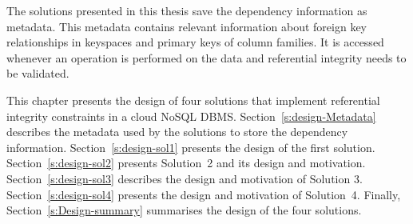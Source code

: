 The solutions presented in this thesis save the dependency information as
metadata.  This metadata contains relevant  information about  foreign
key relationships in keyspaces and primary keys of column families.  It is
accessed whenever an operation is performed on the data and referential
integrity needs to be validated. 


This chapter presents the design of  four  solutions  that implement referential
integrity constraints in a cloud \ac{NoSQL} \ac{DBMS}. 
Section~\ref{s:design-Metadata} describes the metadata used by the solutions 
 to store the dependency information.  Section~\ref{s:design-sol1} presents the
 design of the first solution.  Section~\ref{s:design-sol2} presents Solution~2
 and its design and motivation.  Section~\ref{s:design-sol3} describes the design
 and motivation of Solution 3.  Section~\ref{s:design-sol4} presents the design
 and motivation of Solution~4.  Finally,  Section~\ref{s:Design-summary}
 summarises the design of the four solutions. 













